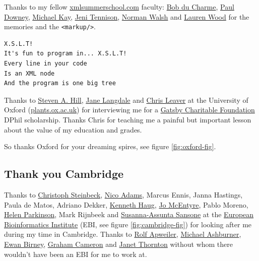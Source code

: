 \documentclass[
]{book}
\begin{document}
Thanks to my fellow \href{https://xmlsummerschool.com/}{xmlsummerschool.com} faculty: \href{https://www.bobdc.com/blog/}{Bob du Charme}, \href{https://twitter.com/psd}{Paul Downey}, \href{https://en.wikipedia.org/wiki/Michael_Howard_Kay}{Michael Kay}, \href{https://en.wikipedia.org/wiki/Jeni_Tennison}{Jeni Tennison}, \href{https://norman.walsh.name/}{Norman Walsh} and \href{https://www.laurenwood.org/}{Lauren Wood} for the memories and the \texttt{\textless{}markup/\textgreater{}}. \citep{xslt, ymca}

\begin{verbatim}
X.S.L.T!
It's fun to program in... X.S.L.T!
Every line in your code
Is an XML node
And the program is one big tree
\end{verbatim}



Thanks to \href{https://en.wikipedia.org/wiki/Steven_A._Hill}{Steven A. Hill}, \href{https://en.wikipedia.org/wiki/Jane_A._Langdale}{Jane Langdale} and \href{https://en.wikipedia.org/wiki/Chris_J._Leaver}{Chris Leaver} at the University of Oxford (\href{https://www.plants.ox.ac.uk/}{plants.ox.ac.uk}) for interviewing me for a \href{https://www.gatsby.org.uk/about-gatsby}{Gatsby Charitable Foundation} DPhil scholarship. Thanks Chris for teaching me a painful but important lesson about the value of my education and grades.

So thanks Oxford for your dreaming spires, see figure \ref{fig:oxford-fig}. 🙏

\hypertarget{cambridge}{%
\subsection{Thank you Cambridge}\label{cambridge}}

Thanks to \href{https://en.wikipedia.org/wiki/Christoph_Steinbeck}{Christoph Steinbeck}, \href{https://scholar.google.com/citations?user=3-PcEsEAAAAJ}{Nico Adams}, Marcus Ennis, Janna Hastings, Paula de Matos, Adriano Dekker, \href{https://twitter.com/kennethhaug}{Kenneth Haug}, \href{https://twitter.com/jomcentyre}{Jo McEntyre}, Pablo Moreno, \href{https://twitter.com/drp_stuff}{Helen Parkinson}, Mark Rijnbeek and \href{https://en.wikipedia.org/wiki/Susanna-Assunta_Sansone}{Susanna-Assunta Sansone} at the \href{https://en.wikipedia.org/wiki/European_Bioinformatics_Institute}{European Bioinformatics Institute} (EBI, see figure \ref{fig:cambridge-fig}) for looking after me during my time in Cambridge. Thanks to \href{https://en.wikipedia.org/wiki/Rolf_Apweiler}{Rolf Apweiler}, \href{https://en.wikipedia.org/wiki/Michael_Ashburner}{Michael Ashburner}, \href{https://en.wikipedia.org/wiki/Ewan_Birney}{Ewan Birney}, \href{https://www.ebi.ac.uk/about/news/announcements/25-anniversary-embl-ebi/}{Graham Cameron} and \href{https://en.wikipedia.org/wiki/Janet_Thornton}{Janet Thornton} without whom there wouldn't have been an EBI for me to work at.
\end{document}

